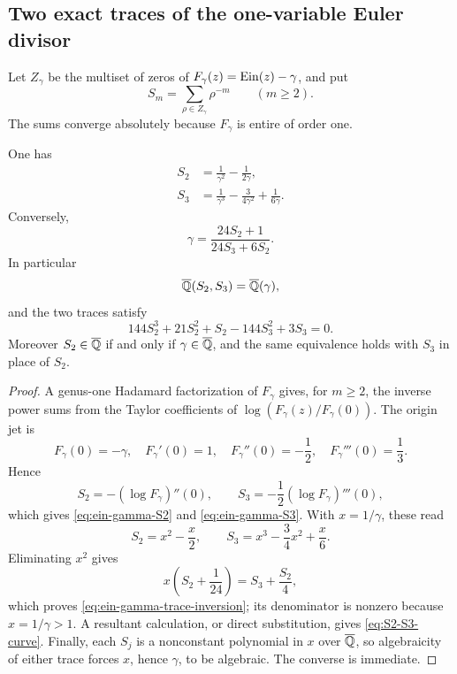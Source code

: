 \subsection{Two exact traces of the one-variable Euler divisor}

Let \(Z_\gamma\) be the multiset of zeros of
\(F_\gamma(z)=\operatorname{Ein}(z)-\gamma\), and put
\begin{equation}\label{eq:one-variable-traces}
 S_m=\sum_{\rho\in Z_\gamma}\rho^{-m}\qquad(m\ge2).
\end{equation}
The sums converge absolutely because \(F_\gamma\) is entire of order one.

\begin{theorem}
\label{thm:ein-gamma-trace-recovery}
One has
\begin{align}
 S_2&=\frac1{\gamma^2}-\frac1{2\gamma},
 \label{eq:ein-gamma-S2}\\
 S_3&=\frac1{\gamma^3}-\frac3{4\gamma^2}+\frac1{6\gamma}.
 \label{eq:ein-gamma-S3}
\end{align}
Conversely,
\begin{equation}\label{eq:ein-gamma-trace-inversion}
 \boxed{\displaystyle
 \gamma=\frac{24S_2+1}{24S_3+6S_2}.}
\end{equation}
In particular
\[
 \overline{\mathbb Q}(S_2,S_3)=\overline{\mathbb Q}(\gamma),
\]
and the two traces satisfy
\begin{equation}\label{eq:S2-S3-curve}
 144S_2^3+21S_2^2+S_2-144S_3^2+3S_3=0.
\end{equation}
Moreover \(S_2\in\overline{\mathbb Q}\) if and only if \(\gamma\in\overline{\mathbb Q}\), and the same
equivalence holds with \(S_3\) in place of \(S_2\).
\end{theorem}

\begin{proof}
A genus-one Hadamard factorization of \(F_\gamma\) gives, for \(m\ge2\),
the inverse power sums from the Taylor coefficients of
\(\log(F_\gamma(z)/F_\gamma(0))\).  The origin jet is
\[
 F_\gamma(0)=-\gamma,\quad
 F_\gamma'(0)=1,\quad
 F_\gamma''(0)=-\frac12,\quad
 F_\gamma'''(0)=\frac13.
\]
Hence
\[
 S_2=-\left(\log F_\gamma\right)''(0),
 \qquad
 S_3=-\frac12\left(\log F_\gamma\right)'''(0),
\]
which gives \eqref{eq:ein-gamma-S2} and
\eqref{eq:ein-gamma-S3}.  With \(x=1/\gamma\), these read
\[
 S_2=x^2-\frac x2,
 \qquad
 S_3=x^3-\frac34x^2+\frac x6.
\]
Eliminating \(x^2\) gives
\[
 x\left(S_2+\frac1{24}\right)=S_3+\frac{S_2}{4},
\]
which proves \eqref{eq:ein-gamma-trace-inversion}; its denominator is
nonzero because \(x=1/\gamma>1\).  A resultant calculation, or direct
substitution, gives \eqref{eq:S2-S3-curve}.  Finally, each \(S_j\) is a
nonconstant polynomial in \(x\) over \(\overline{\mathbb Q}\), so algebraicity of either
trace forces \(x\), hence \(\gamma\), to be algebraic.  The converse is
immediate.
\end{proof}


